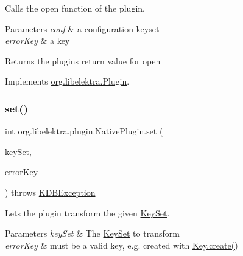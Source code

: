 Calls the open function of the plugin. 


\begin{DoxyParams}{Parameters}
{\em conf} & a configuration keyset \\
\hline
{\em error\+Key} & a key \\
\hline
\end{DoxyParams}
\begin{DoxyReturn}{Returns}
the plugin\textquotesingle{}s return value for open 
\end{DoxyReturn}


Implements \mbox{\hyperlink{interfaceorg_1_1libelektra_1_1Plugin_a740f0602ea62e7a28c86fc801add8907}{org.\+libelektra.\+Plugin}}.

\mbox{\label{classorg_1_1libelektra_1_1plugin_1_1NativePlugin_a9faeb1e6eb90a4c90681eeeb097eeb53}} 
\subsubsection{\texorpdfstring{set()}{set()}}
{\footnotesize\ttfamily int org.\+libelektra.\+plugin.\+Native\+Plugin.\+set (\begin{DoxyParamCaption}\item[{\mbox{\hyperlink{classorg_1_1libelektra_1_1KeySet}{Key\+Set}}}]{key\+Set,  }\item[{\mbox{\hyperlink{classorg_1_1libelektra_1_1Key}{Key}}}]{error\+Key }\end{DoxyParamCaption}) throws \mbox{\hyperlink{classorg_1_1libelektra_1_1exception_1_1KDBException}{K\+D\+B\+Exception}}\hspace{0.3cm}{\ttfamily [inline]}}



Lets the plugin transform the given \mbox{\hyperlink{classorg_1_1libelektra_1_1KeySet}{Key\+Set}}. 


\begin{DoxyParams}{Parameters}
{\em key\+Set} & The \mbox{\hyperlink{classorg_1_1libelektra_1_1KeySet}{Key\+Set}} to transform \\
\hline
{\em error\+Key} & must be a valid key, e.\+g. created with \mbox{\hyperlink{classorg_1_1libelektra_1_1Key_af407cf43625618af4e7fb2576037fcfc}{Key.\+create()}} \\
\hline
\end{DoxyParams}

